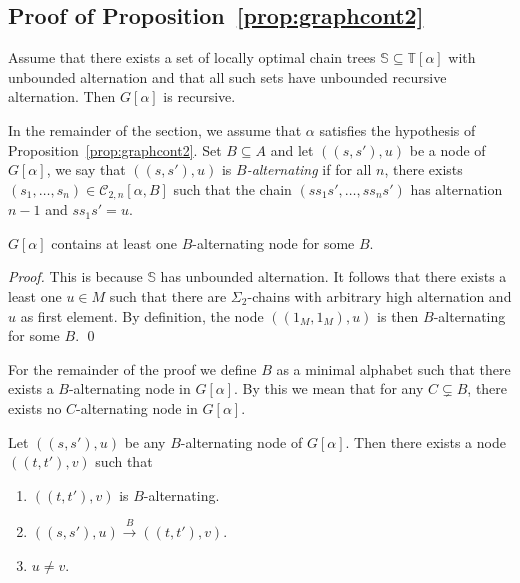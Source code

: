 \documentclass[envcountsame]{llncs}
\newcounter{sauvegarde}
\newcommand\adjustc[1]{\protect{\setcounter{sauvegarde}{\thetheorem}
  \setcounterref{theorem}{#1}
  \addtocounter{theorem}{-1}
}}
\newcommand\restorec{
\setcounter{theorem}{\thesauvegarde}
}
\newcommand\Cs{\ensuremath{\mathcal{C}}\xspace}
\newcommand\Cstwolen[1]{\ensuremath{\Cs_{2,#1}}\xspace}
\newcommand\Cstwon{\ensuremath{\Cstwolen{n}}\xspace}
\newcommand\ct{\ensuremath{\mathbb{T}}\xspace}
\newcommand\cs{\ensuremath{\mathbb{S}}\xspace}
\newcommand{\sic}[1]{\ensuremath{\Sigma_{#1}}\xspace}
\newcommand\chain{chain\xspace}
\newcommand\qchains[1]{\ensuremath{\sic{#1}}-chains\xspace}
\newcommand\dchains{\qchains{2}}
\begin{document}
\subsection{Proof of Proposition~\ref{prop:graphcont2}}

\adjustc{prop:graphcont2}
\begin{proposition}
  Assume that there exists a set of locally optimal \chain
  trees $\cs \subseteq \ct[\alpha]$ with unbounded alternation and that
  all such sets have unbounded recursive alternation. Then $G[\alpha]$
  is recursive.
\end{proposition}
\restorec

In the remainder of the section, we assume that $\alpha$ satisfies the
hypothesis of Proposition~\ref{prop:graphcont2}. Set $B \subseteq A$
and let $((s,s'),u)$ be a node of $G[\alpha]$, we say that
$((s,s'),u)$ is \emph{$B$-alternating} if for all $n$, there exists 
$(s_1,\dots,s_n) \in \Cstwon[\alpha,B]$ such that the \chain
$(ss_1s',\dots,ss_ns')$ has alternation $n-1$ and $ss_1s' = u$. 

\begin{lemma} \label{lem:alt1}
  $G[\alpha]$ contains at least one $B$-alternating node for some $B$.
\end{lemma}

\begin{proof}
  This is because $\cs$ has unbounded alternation. It follows that there
  exists a least one $u \in M$ such that there are \dchains with
  arbitrary high alternation and $u$ as first element. By definition,
  the node $((1_M,1_M),u)$ is then $B$-alternating for some $B$. \qed
\end{proof}

For the remainder of the proof we define $B$ as a minimal alphabet
such that there exists a $B$-alternating node in $G[\alpha]$. By this
we mean that for any $C \subsetneq B$, there exists no
$C$-alternating node in $G[\alpha]$.

\begin{lemma} \label{lem:alt2}
  Let $((s,s'),u)$ be any $B$-alternating node of $G[\alpha]$. Then
  there exists a node $((t,t'),v)$ such that

  \begin{enumerate}
  \item $((t,t'),v)$ is $B$-alternating.
  \item $((s,s'),u) \xrightarrow{B} ((t,t'),v)$.
  \item $u \neq v$.
  \end{enumerate}
\end{lemma}
\end{document}
